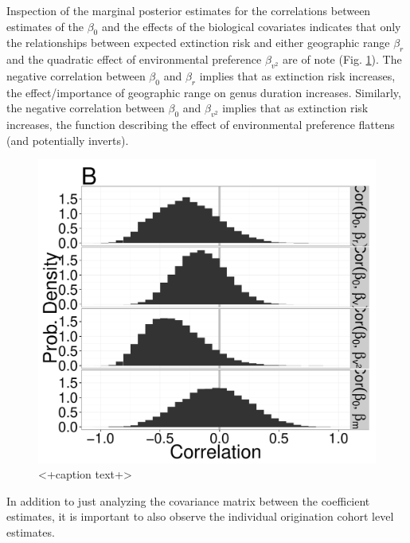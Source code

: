 \documentclass[12pt,letterpaper]{article}
\begin{document}
Inspection of the marginal posterior estimates for the correlations between estimates of the \(\beta_{0}\) and the effects of the biological covariates indicates that only the relationships between expected extinction risk and either geographic range \(\beta_{r}\) and the quadratic effect of environmental preference \(\beta_{v^{2}}\) are of note (Fig. \ref{fig:corr}). The negative correlation between \(\beta_{0}\) and \(\beta_{r}\) implies that as extinction risk increases, the effect/importance of geographic range on genus duration increases. Similarly, the negative correlation between \(\beta_{0}\) and \(\beta_{v^{2}}\) implies that as extinction risk increases, the function describing the effect of environmental preference flattens (and potentially inverts).
\begin{figure}[ht]
  \centering
  \includegraphics[height = 0.5\textheight,width=\textwidth,keepaspectratio=true]{figure/correlation_marginal}
  \caption{<+caption text+>}
  \label{fig:corr}
\end{figure}

In addition to just analyzing the covariance matrix between the coefficient estimates, it is important to also observe the individual origination cohort level estimates. 
\end{document}
